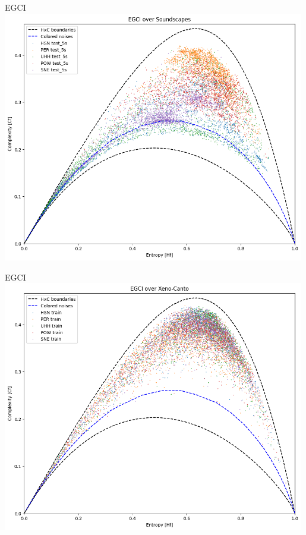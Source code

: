 \begin{frame}{EGCI}
    \centering
    \includegraphics[height=0.99\textheight,width=0.99\textwidth,keepaspectratio]{images/soundscape_egci.png}
\end{frame}

\begin{frame}{EGCI}
    \centering
    \includegraphics[height=0.99\textheight,width=0.99\textwidth,keepaspectratio]{images/xeno-canto_egci.png}
\end{frame}